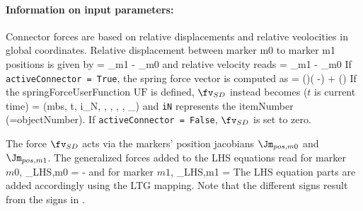 \paragraph{Information on input parameters:} 
\finishTable
 \noindent
    \finishTable
    Connector forces are based on relative displacements and relative veolocities in global coordinates.
    Relative displacement between marker m0 to marker m1 positions is given by
    \be \label{eq_ObjectCartesianSpringDamper_deltaPos}
      \Delta\! = _{m1} - _{m0} \eqComma
    \ee
    and relative velocity reads
    \be
      \Delta\! = _{m1} - _{m0} \eqDot
    \ee
    If \texttt{activeConnector = True}, the spring force vector is computed as
    \be
       = \diag(\kv)\cdot(\Delta\! -) + \diag(\dv) \cdot \Delta\!  \eqDot
    \ee
    If the springForceUserFunction $\mathrm{UF}$ is defined, $\fv_{SD}$ instead becomes ($t$ is current time)
    \be
       = (mbs, t, i_N, \Delta\! , \Delta\! , \kv, \dv, \vv_{}) \eqComma
    \ee
    and \texttt{iN} represents the itemNumber (=objectNumber).
    If \texttt{activeConnector = False}, $\fv_{SD}$ is set to zero.

    The force $\fv_{SD}$ acts via the markers' position jacobians $\Jm_{pos,m0}$ and $\Jm_{pos,m1}$.
    The generalized forces added to the \ac{LHS} equations read for marker $m0$,
    \be
      \fv_{LHS,m0} = -  \eqComma
    \ee
    and for marker $m1$,
    \be
      \fv_{LHS,m1} =    \eqDot
    \ee
    The \ac{LHS} equation parts are added accordingly using the \ac{LTG} mapping.
    Note that the different signs result from the signs in .

